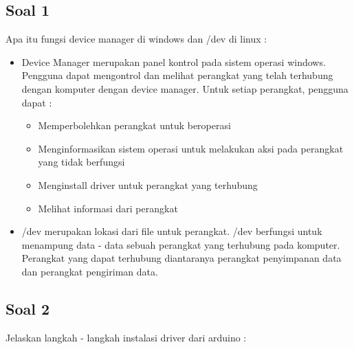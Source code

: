 \subsection{Soal 1}
Apa itu fungsi device manager di windows dan /dev di linux :
\begin{itemize}
	\item Device Manager merupakan panel kontrol pada sistem operasi windows. Pengguna dapat mengontrol dan melihat perangkat yang  telah terhubung dengan komputer dengan device manager. 
	Untuk setiap perangkat, pengguna dapat : 
		\begin{itemize}
			\item Memperbolehkan perangkat untuk beroperasi
			\item Menginformasikan sistem operasi untuk melakukan aksi pada perangkat yang tidak berfungsi
			\item Menginstall driver untuk perangkat yang terhubung
			\item Melihat informasi dari perangkat
		\end{itemize}
	\item /dev merupakan lokasi dari file untuk perangkat. /dev berfungsi untuk menampung data - data sebuah perangkat yang terhubung pada komputer. Perangkat yang dapat terhubung diantaranya perangkat penyimpanan data dan perangkat pengiriman data.
\end{itemize}

\subsection{Soal 2}
Jelaskan langkah - langkah instalasi driver dari arduino : 

